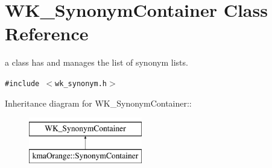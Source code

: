 \hypertarget{classWK__SynonymContainer}{
\section{WK\_\-SynonymContainer Class Reference}
\label{classWK__SynonymContainer}
}
a class has and manages the list of synonym lists.  


{\tt \#include $<$wk\_\-synonym.h$>$}

Inheritance diagram for WK\_\-SynonymContainer::\begin{figure}[H]
\begin{center}
\leavevmode
\includegraphics[height=2cm]{classWK__SynonymContainer}
\end{center}
\end{figure}
